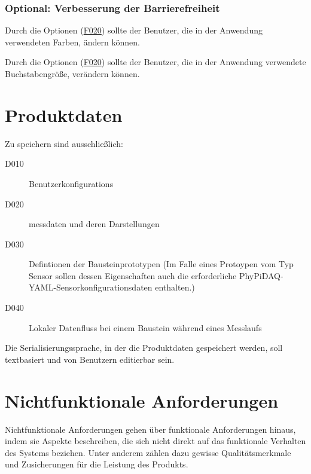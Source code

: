 \documentclass[parskip=full]{scrartcl}
\begin{document}
\subsubsection{Optional: Verbesserung der Barrierefreiheit}

\begin{description}

\hypertarget{link-f510}{\item[(opt.) F510]} Durch die Optionen (\hyperlink{link-f020}{F020}) sollte der Benutzer, die in der Anwendung verwendeten Farben, ändern können.
\hypertarget{link-f520}{\item[(opt.) F520]} Durch die Optionen (\hyperlink{link-f020}{F020}) sollte der Benutzer, die in der Anwendung verwendete Buchstabengröße, verändern können.

\end{description}

\clearpage
\section{Produktdaten}\label{produktdaten}

Zu speichern sind ausschließlich:

\begin{description}

\item[D010] \glspl{Benutzerkonfiguration}
\item[D020] \gls{messdaten} und deren Darstellungen
\item[D030] Defintionen der Bausteinprototypen (Im Falle eines Protoypen vom Typ Sensor sollen dessen Eigenschaften auch die erforderliche PhyPiDAQ-YAML-Sensorkonfigurationsdaten enthalten.)
\item[D040] Lokaler Datenfluss bei einem Baustein während eines Messlaufs 

\end{description}

Die Serialisierungssprache, in der die Produktdaten gespeichert werden, soll textbasiert und von Benutzern editierbar sein.

\clearpage
\section{Nichtfunktionale Anforderungen}\label{nichtfunktionale}

Nichtfunktionale Anforderungen gehen über funktionale Anforderungen hinaus, indem sie Aspekte beschreiben, die sich nicht direkt auf das funktionale Verhalten des Systems beziehen. Unter anderem zählen dazu gewisse Qualitätsmerkmale und Zusicherungen für die Leistung des Produkts.
\end{document}
